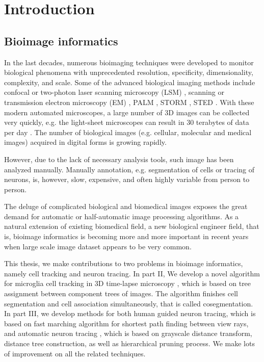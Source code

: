 \chapter{Introduction}
\section{Bioimage informatics}
In the last decades, numerous bioimaging techniques were developed to monitor biological phenomena with unprecedented resolution, specificity, dimensionality, complexity, and scale. Some of the advanced biological imaging methods include confocal or two-photon laser scanning microscopy (LSM) \cite{pawley1995handbook}, scanning or transmission electron microscopy (EM) \cite{bozzola1999electron}, PALM \cite{betzig2006imaging}, STORM \cite{rust2006sub}, STED \cite{hell2003toward}. With these modern automated microscopes, a large number of 3D images can be collected very quickly, e.g. the light-sheet microscopes can result in 30 terabytes of data per day \cite{keller2008reconstruction}. The number of biological images (e.g. cellular, molecular and medical images) acquired in digital forms is growing rapidly. 

However, due to the lack of necessary analysis tools, such image has been analyzed manually. Manually annotation, e.g. segmentation of cells or tracing of neurons, is, however, slow, expensive, and often highly variable from person to person.

The deluge of complicated biological and biomedical images exposes the great demand for automatic or half-automatic image processing algorithms. As a natural extension of existing biomedical field, a new biological engineer field, that is, bioimage informatics is becoming more and more important in recent years when large scale image dataset appears to be very common.

This thesis, we make contributions to two problems in bioimage informatics, namely cell tracking and neuron tracing. In part II, We develop a novel algorithm for microglia cell tracking in 3D time-lapse microscopy \cite{Xiao:2011}, which is based on tree assignment \cite{xiao2011dynamic} between component trees of images. The algorithm finishes cell segmentation and cell association simultaneously, that is called cosegmentation. In part III, we develop methods for both human guided neuron tracing, which is based on fast marching algorithm for shortest path finding between view rays, and automatic neuron tracing \cite{xiao2013app2}, which is based on grayscale distance transform, distance tree construction, as well as hierarchical pruning process. We make lots of improvement on all the related techniques.

